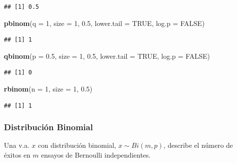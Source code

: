 \documentclass[]{article}
\newenvironment{Shaded}{\begin{snugshade}}{\end{snugshade}}
\newcommand{\DataTypeTok}[1]{\textcolor[rgb]{0.13,0.29,0.53}{#1}}
\newcommand{\DecValTok}[1]{\textcolor[rgb]{0.00,0.00,0.81}{#1}}
\newcommand{\FloatTok}[1]{\textcolor[rgb]{0.00,0.00,0.81}{#1}}
\newcommand{\KeywordTok}[1]{\textcolor[rgb]{0.13,0.29,0.53}{\textbf{#1}}}
\newcommand{\NormalTok}[1]{#1}
\newcommand{\OtherTok}[1]{\textcolor[rgb]{0.56,0.35,0.01}{#1}}
\begin{document}
\begin{verbatim}
## [1] 0.5
\end{verbatim}

\begin{Shaded}
\begin{Highlighting}[]
\KeywordTok{pbinom}\NormalTok{(}\DataTypeTok{q =} \DecValTok{1}\NormalTok{,   }\DataTypeTok{size =} \DecValTok{1}\NormalTok{, }\FloatTok{0.5}\NormalTok{, }\DataTypeTok{lower.tail =} \OtherTok{TRUE}\NormalTok{, }\DataTypeTok{log.p =} \OtherTok{FALSE}\NormalTok{)}
\end{Highlighting}
\end{Shaded}

\begin{verbatim}
## [1] 1
\end{verbatim}

\begin{Shaded}
\begin{Highlighting}[]
\KeywordTok{qbinom}\NormalTok{(}\DataTypeTok{p =} \FloatTok{0.5}\NormalTok{, }\DataTypeTok{size =} \DecValTok{1}\NormalTok{, }\FloatTok{0.5}\NormalTok{, }\DataTypeTok{lower.tail =} \OtherTok{TRUE}\NormalTok{, }\DataTypeTok{log.p =} \OtherTok{FALSE}\NormalTok{)}
\end{Highlighting}
\end{Shaded}

\begin{verbatim}
## [1] 0
\end{verbatim}

\begin{Shaded}
\begin{Highlighting}[]
\KeywordTok{rbinom}\NormalTok{(}\DataTypeTok{n =} \DecValTok{1}\NormalTok{,   }\DataTypeTok{size =} \DecValTok{1}\NormalTok{, }\FloatTok{0.5}\NormalTok{)}
\end{Highlighting}
\end{Shaded}

\begin{verbatim}
## [1] 1
\end{verbatim}

\hypertarget{distribucion-binomial}{%
\subsubsection{Distribución Binomial}\label{distribucion-binomial}}

Una v.a. \(x\) con distribución binomial, \(x \sim Bi(m,p)\), describe
el número de éxitos en \(m\) ensayos de Bernoulli independientes.
\end{document}
